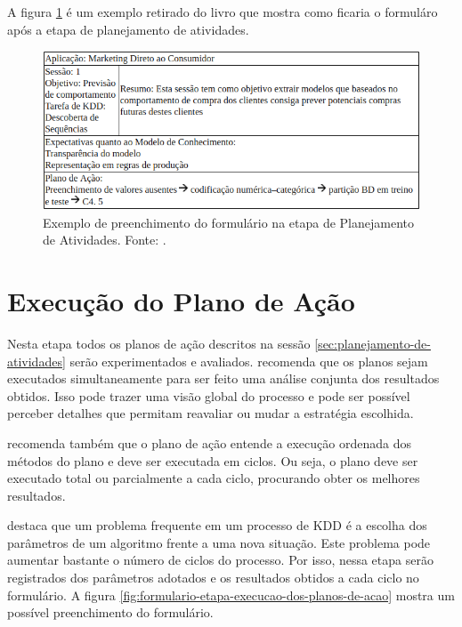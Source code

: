 \documentclass[diss,capa]{texufpel}
\begin{document}
A figura \ref{fig:formulario-etapa-planejamento-atividades} é um exemplo retirado do livro que mostra como ficaria o formuláro após a etapa de planejamento de atividades.

\begin{figure}[htbp]
  \centering \includegraphics[scale=.4]{imagens/formulario-etapa-planejamento-atividades.png}
  \caption{Exemplo de preenchimento do formulário na etapa de Planejamento de Atividades. Fonte: \cite{goldschmidt2015data}.}
  \label{fig:formulario-etapa-planejamento-atividades}
\end{figure}

\section{Execução do Plano de Ação}
\label{sec:execucao-do-plano-de-acao}

Nesta etapa todos os planos de ação descritos na sessão \ref{sec:planejamento-de-atividades} serão experimentados e avaliados. \citet{goldschmidt2015data} recomenda que os planos sejam executados simultaneamente para ser feito uma análise conjunta dos resultados obtidos. Isso pode trazer uma visão global do processo e pode ser possível perceber detalhes que permitam reavaliar ou mudar a estratégia escolhida.

\citet{goldschmidt2015data} recomenda também que o plano de ação entende a execução ordenada dos métodos do plano e deve ser executada em ciclos. Ou seja, o plano deve ser executado total ou parcialmente a cada ciclo, procurando obter os melhores resultados.

\citet{goldschmidt2015data} destaca que um problema frequente em um processo de KDD é a escolha dos parâmetros de um algoritmo frente a uma nova situação. Este problema pode aumentar bastante o número de ciclos do processo. Por isso, nessa etapa serão registrados dos parâmetros adotados e os resultados obtidos a cada ciclo no formulário. A figura \ref{fig:formulario-etapa-execucao-dos-planos-de-acao} mostra um possível preenchimento do formulário.
\end{document}
